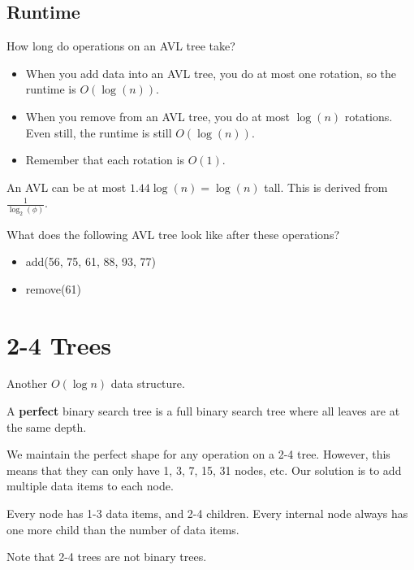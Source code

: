 \documentclass[a4paper]{article}
\begin{document}
\subsection{Runtime}
How long do operations on an AVL tree take?
\begin{itemize}
	\item When you add data into an AVL tree, you do at most one rotation, so the runtime is \( O(\log (n)) \).
	\item When you remove from an AVL tree, you do at most \( \log (n) \) rotations. Even still, the runtime is still \( O(\log (n)) \).
	\item Remember that each rotation is \( O(1) \).
\end{itemize}

\begin{note}
	An AVL can be at most \( 1.44\log (n) =\log (n)\) tall. This is derived from \( \frac{1}{\log_2(\phi )} \).
\end{note}

What does the following AVL tree look like after these operations?
\begin{itemize}
	\item add(56, 75, 61, 88, 93, 77)
	\item remove(61)
\end{itemize}


\section{2-4 Trees}

Another \( O(\log n) \) data structure.
\begin{definition}
	A \textbf{perfect} binary search tree is a full binary search tree where all leaves are at the same depth.
\end{definition}

We maintain the perfect shape for any operation on a 2-4 tree. However, this means that they can only have 1, 3, 7, 15, 31 nodes, etc. Our solution is to add multiple data items to each node.

\begin{property}
	Every node has 1-3 data items, and 2-4 children. Every internal node always has one more child than the number of data items.
\end{property}

\begin{note}
	Note that 2-4 trees are not binary trees.
\end{note}
\end{document}
